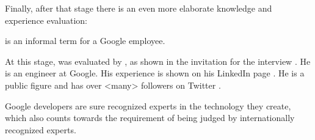 Finally, after that stage there is an even more elaborate knowledge and experience evaluation:


 is an informal term for a Google employee.

At this stage, \mrl was evaluated by \MrGdeGoogleInterviewer,
as shown in the invitation for the interview .
He is an engineer at Google.
His experience is shown on his LinkedIn page .
He is a public figure and has over <many> followers on Twitter .

Google developers are sure recognized experts in the technology they create,
which also counts towards the requirement of being judged by internationally recognized experts.
